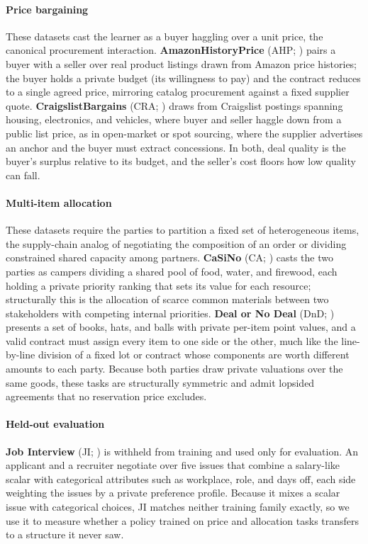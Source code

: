 \documentclass{interact}
\theoremstyle{plain}
\theoremstyle{definition}
\theoremstyle{remark}
\begin{document}
\paragraph{Price bargaining}
These datasets cast the learner as a buyer haggling over a unit price, the canonical procurement interaction. \textbf{AmazonHistoryPrice} (AHP; \cite{xia2024measuring}) pairs a buyer with a seller over real product listings drawn from Amazon price histories; the buyer holds a private budget (its willingness to pay) and the contract reduces to a single agreed price, mirroring catalog procurement against a fixed supplier quote. \textbf{CraigslistBargains} (CRA; \cite{he2018decoupling}) draws from Craigslist postings spanning housing, electronics, and vehicles, where buyer and seller haggle down from a public list price, as in open-market or spot sourcing, where the supplier advertises an anchor and the buyer must extract concessions. In both, deal quality is the buyer's surplus relative to its budget, and the seller's cost floors how low quality can fall.

\paragraph{Multi-item allocation}
These datasets require the parties to partition a fixed set of heterogeneous items, the supply-chain analog of negotiating the composition of an order or dividing constrained shared capacity among partners. \textbf{CaSiNo} (CA; \cite{chawla2021casino}) casts the two parties as campers dividing a shared pool of food, water, and firewood, each holding a private priority ranking that sets its value for each resource; structurally this is the allocation of scarce common materials between two stakeholders with competing internal priorities. \textbf{Deal or No Deal} (DnD; \cite{lewis2017deal}) presents a set of books, hats, and balls with private per-item point values, and a valid contract must assign every item to one side or the other, much like the line-by-line division of a fixed lot or contract whose components are worth different amounts to each party. Because both parties draw private valuations over the same goods, these tasks are structurally symmetric and admit lopsided agreements that no reservation price excludes.

\paragraph{Held-out evaluation}
\textbf{Job Interview} (JI; \cite{yamaguchi2021dialogue}) is withheld from training and used only for evaluation. An applicant and a recruiter negotiate over five issues that combine a salary-like scalar with categorical attributes such as workplace, role, and days off, each side weighting the issues by a private preference profile. Because it mixes a scalar issue with categorical choices, JI matches neither training family exactly, so we use it to measure whether a policy trained on price and allocation tasks transfers to a structure it never saw.
\end{document}
